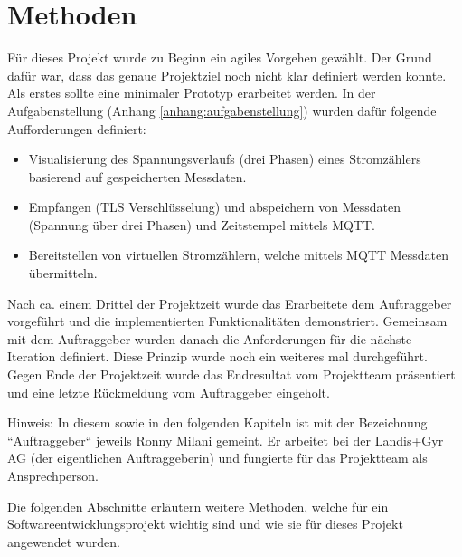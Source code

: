 \chapter{Methoden}
\label{methoden}
Für dieses Projekt wurde zu Beginn ein agiles Vorgehen gewählt.
Der Grund dafür war, dass das genaue Projektziel noch nicht klar definiert werden konnte.
Als erstes sollte eine minimaler Prototyp erarbeitet werden.
In der Aufgabenstellung (Anhang \ref{anhang:aufgabenstellung}) wurden dafür folgende Aufforderungen definiert:
\begin{itemize}
      \item Visualisierung des Spannungsverlaufs (drei Phasen) eines Stromzählers
            basierend auf gespeicherten Messdaten.
      \item Empfangen (TLS Verschlüsselung) und abspeichern von Messdaten (Spannung über drei Phasen) und
            Zeitstempel mittels MQTT.
      \item Bereitstellen von virtuellen Stromzählern, welche mittels MQTT Messdaten
            übermitteln.
\end{itemize}
Nach ca. einem Drittel der Projektzeit wurde das Erarbeitete dem Auftraggeber vorgeführt und die implementierten Funktionalitäten demonstriert.
Gemeinsam mit dem Auftraggeber wurden danach die Anforderungen für die nächste Iteration definiert.
Diese Prinzip wurde noch ein weiteres mal durchgeführt.
Gegen Ende der Projektzeit wurde das Endresultat vom Projektteam präsentiert und eine letzte Rückmeldung vom Auftraggeber eingeholt.


Hinweis: In diesem sowie in den folgenden Kapiteln ist mit der Bezeichnung ``Auftraggeber``
jeweils Ronny Milani gemeint.
Er arbeitet bei der Landis+Gyr AG (der eigentlichen Auftraggeberin) und fungierte für das Projektteam als Ansprechperson.



Die folgenden Abschnitte erläutern weitere Methoden, welche für ein Softwareentwicklungsprojekt
wichtig sind und wie sie für dieses Projekt angewendet wurden.


